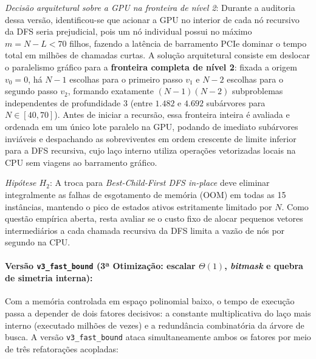 \textit{Decisão arquitetural sobre a GPU na fronteira de nível 2}: Durante a auditoria dessa
versão, identificou-se que acionar a GPU no interior de cada nó recursivo da DFS seria
prejudicial, pois um nó individual possui no máximo $m = N - L < 70$ filhos, fazendo a
latência de barramento PCIe dominar o tempo total em milhões de chamadas curtas. A solução
arquitetural consiste em deslocar o paralelismo gráfico para a \textbf{fronteira completa de
nível 2}: fixada a origem $v_0 = 0$, há $N - 1$ escolhas para o primeiro passo $v_1$ e $N - 2$
escolhas para o segundo passo $v_2$, formando exatamente $(N - 1)(N - 2)$ subproblemas
independentes de profundidade $3$ (entre $1.482$ e $4.692$ subárvores para
$N \in [40, 70]$). Antes de iniciar a recursão, essa fronteira inteira é avaliada e ordenada em
um único lote paralelo na GPU, podando de imediato subárvores inviáveis e despachando as
sobreviventes em ordem crescente de limite inferior para a DFS recursiva, cujo laço interno
utiliza operações vetorizadas locais na CPU sem viagens ao barramento gráfico.

\textit{Hipótese $H_2$}: A troca para \textit{Best-Child-First DFS in-place} deve eliminar
integralmente as falhas de esgotamento de memória (OOM) em todas as 15 instâncias, mantendo o
pico de estados ativos estritamente limitado por $N$. Como questão empírica aberta, resta
avaliar se o custo fixo de alocar pequenos vetores intermediários a cada chamada recursiva da
DFS limita a vazão de nós por segundo na CPU.

\paragraph{Versão \texttt{v3\_fast\_bound} (3ª Otimização: escalar $\Theta(1)$, \textit{bitmask} e quebra de simetria interna):}
Com a memória controlada em espaço polinomial baixo, o tempo de execução passa a depender de
dois fatores decisivos: a constante multiplicativa do laço mais interno (executado milhões de
vezes) e a redundância combinatória da árvore de busca. A versão \texttt{v3\_fast\_bound}
ataca simultaneamente ambos os fatores por meio de três refatorações acopladas:

